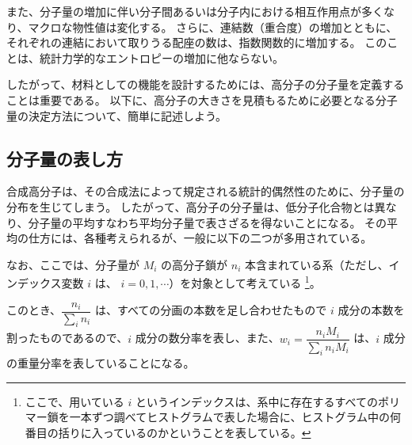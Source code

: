\documentclass[uplatex,dvipdfmx,a4paper,11pt, titlepage]{jsarticle}
\begin{document}
また、分子量の増加に伴い分子間あるいは分子内における相互作用点が多くなり、マクロな物性値は変化する。
さらに、連結数（重合度）の増加とともに、それぞれの連結において取りうる配座の数は、指数関数的に増加する。
このことは、統計力学的なエントロピーの増加に他ならない。

したがって、材料としての機能を設計するためには、高分子の分子量を定義することは重要である。
以下に、高分子の大きさを見積もるために必要となる分子量の決定方法について、簡単に記述しよう。


\subsection{分子量の表し方}

合成高分子は、その合成法によって規定される統計的偶然性のために、分子量の分布を生じてしまう。
したがって、高分子の分子量は、低分子化合物とは異なり、分子量の平均すなわち平均分子量で表さざるを得ないことになる。
その平均の仕方には、各種考えられるが、一般に以下の二つが多用されている。

なお、ここでは、分子量が $M_i$ の高分子鎖が $n_i$ 本含まれている系（ただし、インデックス変数 $i$ は、 $i=0,1,\cdots$）を対象として考えている
\footnote
{
ここで、用いている $i$ というインデックスは、系中に存在するすべてのポリマー鎖を一本ずつ調べてヒストグラムで表した場合に、ヒストグラム中の何番目の括りに入っているのかということを表している。
}。


このとき、$\dfrac{n_i}{\sum_i n_i}$ は、すべての分画の本数を足し合わせたもので $i$ 成分の本数を割ったものであるので、$i$ 成分の数分率を表し、また、$w_i=\dfrac{n_i M_i}{\sum_i n_i M_i}$ は、$i$ 成分の重量分率を表していることになる。
\end{document}
